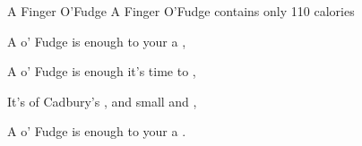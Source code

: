\begin{SBSong}{A Finger O'Fudge}
  {A Finger O'Fudge contains only 110 calories}
  \begin{SBVerse}
    A  o' Fudge is  enough to  your  a ,

    A  o' Fudge is  enough  it's time to ,

    It's  of Cadbury's , and  small and ,

    A  o' Fudge is  enough to  your  a .
  \end{SBVerse}
\end{SBSong}
